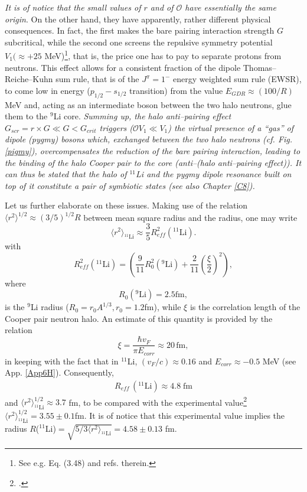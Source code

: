 \textit{It is of notice that the small values of $r$ and of $\mathcal{O}$ have essentially the same origin}. On the other hand, they have apparently, rather different physical consequences. In fact, the first makes the bare pairing interaction strength $G$ subcritical, while the second one screens the repulsive symmetry potential $V_1(\approx +25 $ MeV)\footnote{See e.g. \cite{Bortignon:98} Eq. (3.48) and refs. therein.}, that is, the price one has to pay to separate protons from neutrons. This effect allows for a consistent fraction of the dipole Thomas--Reiche--Kuhn sum rule, that is of the $J^{\pi}=1^-$ energy weighted sum rule (EWSR), to come low in energy ($p_{1/2}-s_{1/2}$ transition) from the value $E_{GDR}\approx(100/R)$ MeV and, acting as an intermediate boson between the two halo neutrons, glue them to the $^{9}$Li core. \textit{Summing up, the halo anti--pairing effect $G_{scr}=r\times G\ll G<G_{crit}$ triggers ($\mathcal{O}V_1\ll V_1$) the virtual presence of a ``gas'' of dipole (pygmy) bosons which, exchanged between the two halo neutrons (cf. Fig. \ref{pigmy}), overcompensates the reduction of the bare pairing interaction, leading to the binding of the halo Cooper pair to the core (anti--(halo anti--pairing effect)). It can thus be stated that the halo of $^{11}$Li and the pygmy dipole resonance built on top of it constitute a pair of symbiotic states (see also Chapter \ref{C8}).}

Let us further elaborate on these issues. Making use of the relation $\langle r^2\rangle^{1/2}\approx (3/5)^{1/2}R$ between mean square radius and the radius, one may write
\begin{equation}\label{eq2.6.9}
\langle r^2\rangle_{^{11}\text{Li}}\approx \frac{3}{5}R_{eff}^2(^{11}\text{Li}).
\end{equation}
 with
\begin{equation}\label{eq2.6.10}
R_{eff}^2(^{11}\text{Li})=\left(\frac{9}{11}R_0^2(^9\text{Li})+\frac{2}{11}\left(\frac{\xi}{2}\right)^2\right),
\end{equation}
where
\begin{equation}
R_0(^9\text{Li})=2.5 \text{fm},
\end{equation}
is the $^9$Li radius ($R_0=r_0A^{1/3}, r_0=1.2$fm), while $\xi$ is the correlation length of the Cooper pair neutron halo. An estimate of this quantity is provided by the relation
 \begin{equation}
\xi=\frac{\hbar v_F}{\pi E_{corr}}\approx 20 \, \text{fm},
 \end{equation}
in keeping with the fact that in $^{11}$Li, $(v_F/c)\approx 0.16$ and $E_{corr}\approx-0.5$ MeV (see App. \ref{App6H}). Consequently, 
\begin{align}\label{eq2.F.5}
R_{eff}\,(^{11}\text{Li})\approx 4.8 \;\text{fm}
\end{align} 
and  $\langle r^2\rangle_{^{11}\text{Li}}^{1/2}\approx 3.7$ fm, to be compared with the experimental value\footnote{\cite{Kobayashi:89}.} $\langle r^2\rangle_{^{11}\text{Li}}^{1/2}= 3.55\pm0.1$fm. It is of notice that this experimental value implies  the radius $R$($^{11}$Li)$=\sqrt{5/3\langle r^2\rangle_{^{11}\text{Li}}}=4.58\pm 0.13$ fm.



